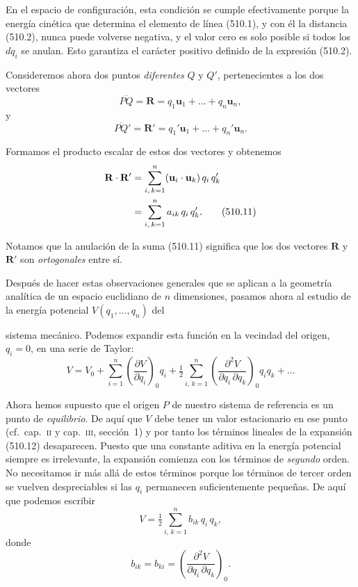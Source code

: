 \documentclass[12pt,a4paper]{book}
\newcommand{\vect}[1]{\mathbf{#1}}
\begin{document}
En el espacio de configuración, esta condición se cumple efectivamente porque la energía cinética que determina el elemento de línea (510.1), y con él la distancia (510.2), nunca puede volverse negativa, y el valor cero es solo posible si todos los $dq_i$ se anulan. Esto garantiza el carácter positivo definido de la expresión (510.2).

Consideremos ahora dos puntos \textit{diferentes} $Q$ y $Q'$, pertenecientes a los dos vectores
\begin{equation}
\overline{PQ} = \vect{R} = q_1 \vect{u}_1 + \ldots + q_n \vect{u}_n, \tag{510.9}
\end{equation}
y
\begin{equation}
\overline{PQ}' = \vect{R}' = q_1' \vect{u}_1 + \ldots + q_n' \vect{u}_n. \tag{510.10}
\end{equation}

Formamos el producto escalar de estos dos vectores y obtenemos
\begin{align}
\vect{R} \cdot \vect{R}' &= \sum_{i,\,k=1}^{n} (\vect{u}_i \cdot \vect{u}_k)\,q_i\,q_k' \notag \\
&= \sum_{i,\,k=1}^{n} a_{ik}\,q_i\,q_k'. \tag{510.11}
\end{align}

Notamos que la anulación de la suma (510.11) significa que los dos vectores $\vect{R}$ y $\vect{R}'$ son \textit{ortogonales} entre sí.

Después de hacer estas observaciones generales que se aplican a la geometría analítica de un espacio euclidiano de $n$ dimensiones, pasamos ahora al estudio de la energía potencial $V(q_1, \ldots, q_n)$ del


sistema mecánico. Podemos expandir esta función en la vecindad del origen, $q_i = 0$, en una serie de Taylor:
\begin{equation}
V = V_0 + \sum_{i=1}^{n} \left(\frac{\partial V}{\partial q_i}\right)_0 q_i + \tfrac{1}{2} \sum_{i,\,k=1}^{n} \left(\frac{\partial^2 V}{\partial q_i \,\partial q_k}\right)_0 q_i q_k + \ldots \tag{510.12}
\end{equation}

Ahora hemos supuesto que el origen $P$ de nuestro sistema de referencia es un punto de \textit{equilibrio}. De aquí que $V$ debe tener un valor estacionario en ese punto (cf.\ cap.~\textsc{ii} y cap.~\textsc{iii}, sección~1) y por tanto los términos lineales de la expansión (510.12) desaparecen. Puesto que una constante aditiva en la energía potencial siempre es irrelevante, la expansión comienza con los términos de \textit{segundo} orden. No necesitamos ir más allá de estos términos porque los términos de tercer orden se vuelven despreciables si las $q_i$ permanecen suficientemente pequeñas. De aquí que podemos escribir
\begin{equation}
V = \tfrac{1}{2} \sum_{i,\,k=1}^{n} b_{ik}\,q_i\,q_k, \tag{510.13}
\end{equation}
donde
\begin{equation}
b_{ik} = b_{ki} = \left(\frac{\partial^2 V}{\partial q_i \,\partial q_k}\right)_0. \tag{510.14}
\end{equation}
\end{document}

